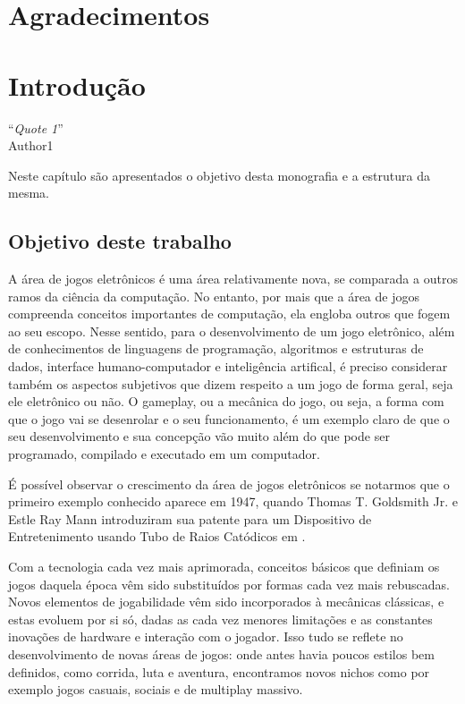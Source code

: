\documentclass[brazil]{abnt}
\begin{document}
\chapter*{Agradecimentos}

\tableofcontents{}
\listoffigures

\chapter{Introdução\label{cap:introducao}}

\vfill{}
\begin{flushright}{}``\emph{Quote 1}''\\
{\small Author1}\end{flushright}{\small \par}
\vfill{}

Neste capítulo são apresentados o objetivo desta monografia e a estrutura da mesma.
\newpage


\section{Objetivo deste trabalho}

A área de jogos eletrônicos é uma área relativamente nova, se comparada a outros ramos da ciência da computação. No entanto, por mais que a área de jogos compreenda conceitos importantes de computação, ela engloba outros que fogem ao seu escopo. Nesse sentido, para o desenvolvimento de um jogo eletrônico, além de conhecimentos de linguagens de programação, algoritmos e estruturas de dados, interface humano-computador e inteligência artifical, é preciso considerar também os aspectos subjetivos que dizem respeito a um jogo de forma geral, seja ele eletrônico ou não. O gameplay, ou a mecânica do jogo, ou seja, a forma com que o jogo vai se desenrolar e o seu funcionamento, é um exemplo claro de que o seu desenvolvimento e sua concepção vão muito além do que pode ser programado, compilado e executado em um computador.

É possível observar o crescimento da área de jogos eletrônicos se notarmos que o primeiro exemplo conhecido aparece em 1947, quando Thomas T. Goldsmith Jr. e Estle Ray Mann introduziram sua patente para um Dispositivo de Entretenimento usando Tubo de Raios Catódicos em \cite{2455992}. 

Com a tecnologia cada vez mais aprimorada, conceitos básicos que definiam os jogos daquela época vêm sido substituídos por formas cada vez mais rebuscadas. Novos elementos de jogabilidade vêm sido incorporados à mecânicas clássicas, e estas evoluem por si só, dadas as cada vez menores limitações e as constantes inovações de hardware e interação com o jogador. Isso tudo se reflete no desenvolvimento de novas áreas de jogos: onde antes havia poucos estilos bem definidos, como corrida, luta e aventura, encontramos novos nichos como por exemplo jogos casuais, sociais e de multiplay massivo.
\end{document}
